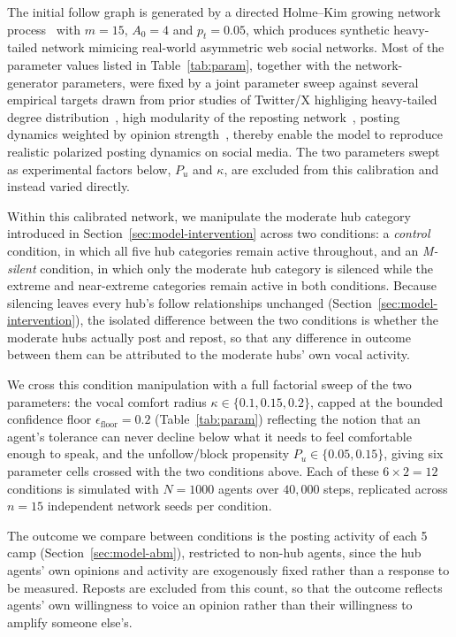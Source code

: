 \documentclass{svproc}
\def\BoundedConfidence{\epsilon} %
\def\VCR{\kappa}                 %
\begin{document}
The initial follow graph is generated by a directed
Holme--Kim growing network process~\cite{holme2002} 
with $m=15$, $A_0=4$ 
and $p_t=0.05$, which produces 
synthetic heavy-tailed network mimicing real-world 
asymmetric web social networks.
Most of the parameter values listed in
Table~\ref{tab:param}, together with the
network-generator parameters, were 
fixed by a joint parameter
sweep against several empirical targets drawn from
prior studies of Twitter/X
highliging heavy-tailed degree distribution~\cite{kwak2010}, 
high modularity of the reposting network~\cite{conover2011}, 
posting dynamics weighted by opinion strength~\cite{buntain2025}, 
thereby enable the model to reproduce realistic polarized posting dynamics
on social media. 
The two
parameters swept as experimental factors below,
$P_u$ and $\VCR$, are excluded from this
calibration and instead varied directly.

Within this calibrated network, 
we manipulate the moderate hub category
introduced in Section~\ref{sec:model-intervention}
across two conditions: a \emph{control} condition, in which
all five hub categories remain active throughout,
and an \emph{M-silent} condition, in which only the
moderate hub category is silenced while the
extreme and near-extreme categories remain active
in both conditions. Because silencing leaves every
hub's follow relationships unchanged
(Section~\ref{sec:model-intervention}), the isolated
difference between the two conditions is whether the
moderate hubs actually post and repost, so that
any difference in outcome between them can be
attributed to the moderate hubs' own vocal
activity.

We cross this condition manipulation with a full
factorial sweep of the two parameters: the
vocal comfort radius $\VCR\in\{0.1,0.15,0.2\}$,
capped at the bounded confidence floor
$\BoundedConfidence_{\mathrm{floor}}=0.2$
(Table~\ref{tab:param}) reflecting the notion that 
an agent's
tolerance can never decline below what it needs
to feel comfortable enough to speak, and
the unfollow/block propensity $P_u\in\{0.05,0.15\}$,
giving six parameter cells crossed with the two
conditions above. Each of these $6\times2=12$ conditions
is simulated with $N=1000$ agents over $40{,}000$
steps, replicated across $n=15$ independent
network seeds per condition.

The outcome we compare between conditions is the
posting activity of each 5 camp
(Section~\ref{sec:model-abm}), restricted to
non-hub agents, since the hub agents' own opinions
and activity are exogenously fixed rather than a
response to be measured.
Reposts are excluded from this
count, so that the outcome reflects agents' own
willingness to voice an opinion rather than their
willingness to amplify someone else's.
\end{document}
